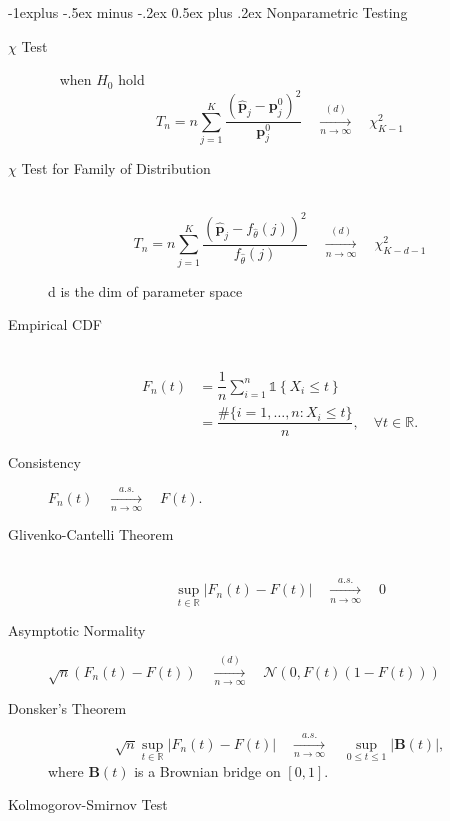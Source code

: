 \documentclass[a4paper, 10pt,landscape]{article}
\makeatletter
\renewcommand{\subsection}{\@startsection{subsection}{2}{0mm}%
                                {-1explus -.5ex minus -.2ex}%
                                {0.5ex plus .2ex}%
                                {\normalfont\normalsize\bfseries}}
\makeatother
\begin{document}
\begin{multicols*}{3}
\subsection{Nonparametric Testing}
	\begin{description}
		\item[$\chi$ Test]~
			when $H_0$ hold $$T_n=n\sum_{j=1}^{K}\dfrac{\left(\widehat{\mathbf{p}}_j-\mathbf{p}_j^0\right)^2}{\mathbf{p}_j^0}\quad\xrightarrow[n\rightarrow\infty]{(d)}\quad\chi_{K-1}^2$$
		\item[$\chi$ Test for Family of Distribution]~
			$$T_n=n\sum_{j=1}^{K}\dfrac{\left(\widehat{\mathbf{p}}_j- f_{\widehat{\theta}}(j) \right)^2}{f_{\widehat{\theta}}(j)}\quad\xrightarrow[n\rightarrow\infty]{(d)}\quad\chi_{K-d-1}^2$$
			
			d is the dim of parameter space
		\item[Empirical CDF]~
			\begin{align*}
				F_n(t)&=\dfrac{1}{n}\sum_{i=1}^{n}\mathds{1}\left\{X_i\leq t\right\}\\
				&=\dfrac{\#\{i=1,\dots,n:X_i\leq t\}}{n},\quad\forall t\in\mathbb{R}.
			\end{align*}
		\item[Consistency] $F_n(t)\quad\xrightarrow[n\rightarrow\infty]{a.s.}\quad F(t).$
		\item[Glivenko-Cantelli Theorem] ~ $$\sup\limits_{t\in\mathbb{R}}\left|F_n(t)-F(t)\right|\quad\xrightarrow[n\rightarrow\infty]{a.s.}\quad0$$
		\item[Asymptotic Normality] $\sqrt{n}\left(F_n(t)-F(t)\right)\quad\xrightarrow[n\rightarrow\infty]{(d)}\quad\mathcal{N}\left(0,F(t)\left(1-F(t)\right)\right)$
		\item[Donsker's Theorem] $$\sqrt{n}\sup\limits_{t\in\mathbb{R}}\left|F_n(t)-F(t)\right|\quad\xrightarrow[n\rightarrow\infty]{a.s.}\quad\sup\limits_{0\leq t\leq 1}\left|\mathbf{B}(t)\right|,$$
	where $\mathbf{B}(t)$ is a Brownian bridge on $[0,1]$. 
		\item[Kolmogorov-Smirnov Test]~
\end{description}
\end{multicols*}
\end{document}
